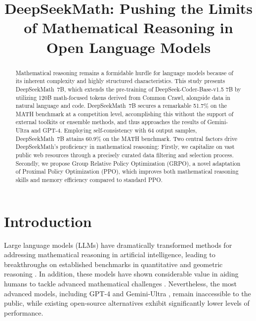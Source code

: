 \title{DeepSeekMath: Pushing the Limits of Mathematical Reasoning in Open Language Models}

\begin{abstract}
Mathematical reasoning remains a formidable hurdle for language models because of its inherent complexity and highly structured characteristics. This study presents DeepSeekMath~7B, which extends the pre-training of DeepSeek-Coder-Base-v1.5 7B by utilizing 120B math-focused tokens derived from Common Crawl, alongside data in natural language and code. DeepSeekMath~7B secures a remarkable 51.7\% on the MATH benchmark at a competition level, accomplishing this without the support of external toolkits or ensemble methods, and thus approaches the results of Gemini-Ultra and GPT-4. Employing self-consistency with 64 output samples, DeepSeekMath~7B attains 60.9\% on the MATH benchmark. Two central factors drive DeepSeekMath’s proficiency in mathematical reasoning: Firstly, we capitalize on vast public web resources through a precisely curated data filtering and selection process. Secondly, we propose Group Relative Policy Optimization (GRPO), a novel adaptation of Proximal Policy Optimization (PPO), which improves both mathematical reasoning skills and memory efficiency compared to standard PPO.
\end{abstract}

\section{Introduction}

Large language models (LLMs) have dramatically transformed methods for addressing mathematical reasoning in artificial intelligence, leading to breakthroughs on established benchmarks in quantitative \citep{MATH} and geometric reasoning \citep{trinh2024solving}. In addition, these models have shown considerable value in aiding humans to tackle advanced mathematical challenges \citep{tao}. Nevertheless, the most advanced models, including GPT-4 \citep{gpt4} and Gemini-Ultra \citep{gemini}, remain inaccessible to the public, while existing open-source alternatives exhibit significantly lower levels of performance.

